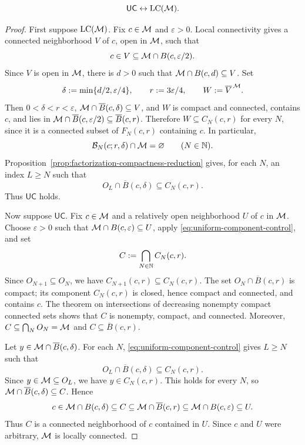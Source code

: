 \begin{theorem}
\label{thm:uniform-component-control}
\[
 \mathsf{UC}\leftrightarrow\operatorname{LC}(\mathcal M).
\]
\end{theorem}
\begin{proof}
First suppose \(\operatorname{LC}(\mathcal M)\). Fix \(c\in\mathcal M\) and \(\varepsilon>0\).
Local connectivity gives a connected neighborhood \(V\) of \(c\), open
in \(\mathcal M\), such that
\[
 c\in V\subseteq \mathcal M\cap B(c,\varepsilon/2).
\]
Since \(V\) is open in \(\mathcal M\), there is \(d>0\) such that
\(\mathcal M\cap B(c,d)\subseteq V\). Set
\[
 \delta:=\min\{d/2,\varepsilon/4\},\qquad r:=3\varepsilon/4,
 \qquad W:=\overline V^{\,\mathcal M}.
\]
Then \(0<\delta<r<\varepsilon\),
\(\mathcal M\cap\overline B(c,\delta)\subseteq V\), and \(W\) is compact and
connected, contains \(c\), and lies in
\(\mathcal M\cap\overline B(c,\varepsilon/2)\subseteq\overline B(c,r)\).
Therefore \(W\subseteq C_N(c,r)\) for every \(N\), since it is a
connected subset of \(F_N(c,r)\) containing \(c\). In particular,
\[
 \mathcal B_N(c;r,\delta)\cap\mathcal M=\varnothing
 \qquad(N\in\mathbb N).
\]
Proposition~\ref{prop:factorization-compactness-reduction} gives, for
each \(N\), an index \(L\ge N\) such that
\[
 O_L\cap\overline B(c,\delta)\subseteq C_N(c,r).
\]
Thus \(\mathsf{UC}\) holds.

Now suppose \(\mathsf{UC}\). Fix \(c\in\mathcal M\) and a relatively open
neighborhood \(U\) of \(c\) in \(\mathcal M\). Choose \(\varepsilon>0\) such
that \(\mathcal M\cap B(c,\varepsilon)\subseteq U\), apply
\eqref{eq:uniform-component-control}, and set
\[
 C:=\bigcap_{N\in\mathbb N}C_N(c,r).
\]
Since \(O_{N+1}\subseteq O_N\), we have
\(C_{N+1}(c,r)\subseteq C_N(c,r)\). The set
\(O_N\cap\overline B(c,r)\) is compact; its component \(C_N(c,r)\) is
closed, hence compact and connected, and contains \(c\). The theorem
on intersections of decreasing nonempty compact connected sets shows
that \(C\) is nonempty, compact, and connected. Moreover,
\(C\subseteq\bigcap_NO_N=\mathcal M\) and \(C\subseteq\overline B(c,r)\).

Let \(y\in\mathcal M\cap\overline B(c,\delta)\). For each \(N\),
\eqref{eq:uniform-component-control} gives \(L\ge N\) such that
\[
 O_L\cap\overline B(c,\delta)\subseteq C_N(c,r).
\]
Since \(y\in\mathcal M\subseteq O_L\), we have \(y\in C_N(c,r)\). This holds
for every \(N\), so
\(\mathcal M\cap\overline B(c,\delta)\subseteq C\). Hence
\[
 c\in\mathcal M\cap B(c,\delta)\subseteq C
 \subseteq\mathcal M\cap\overline B(c,r)
 \subseteq\mathcal M\cap B(c,\varepsilon)\subseteq U.
\]
Thus \(C\) is a connected neighborhood of \(c\) contained in \(U\).
Since \(c\) and \(U\) were arbitrary, \(\mathcal M\) is locally connected.
\end{proof}

